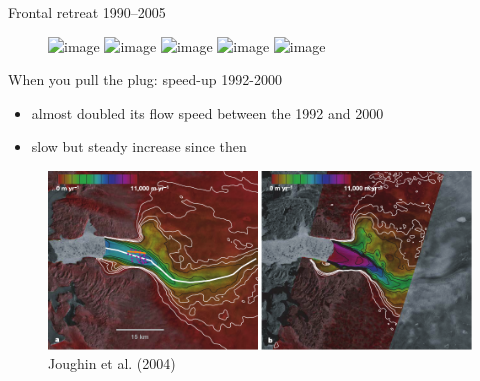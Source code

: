 \documentclass[hide notes,intlimits]{beamer}
\begin{document}
\begin{frame}{Frontal retreat 1990--2005}
 \begin{figure}
    \includegraphics<1>[width=\textwidth]{jib-front-1990}
    \includegraphics<2>[width=\textwidth]{jib-front-1990-floating}
    \includegraphics<3>[width=\textwidth]{jib-front-2005}
    \includegraphics<4>[width=\textwidth]{jib-front-1990-2005-change}
    \includegraphics<5>[width=\textwidth]{jib-front-1990-2005-plug}
  \end{figure}
\end{frame}


\begin{frame}{When you pull the plug: speed-up 1992-2000}
  \begin{itemize}
    \item almost doubled its flow speed between the 1992 and 2000
    \item slow but steady increase since then
  \end{itemize}
  \begin{figure}
    \includegraphics[width=\textwidth]{Joughin2004Fig2} \\
    \footnotesize{Joughin et al. (2004)}
  \end{figure}
\end{frame}


  {
}
\end{document}
